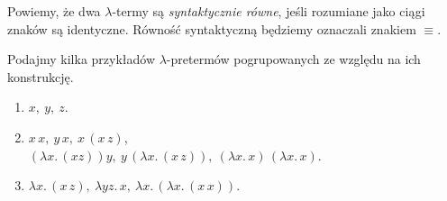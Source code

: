 Powiemy, że dwa \(\lambda\)-termy są \emph{syntaktycznie równe}, jeśli rozumiane jako ciągi znaków są identyczne. Równość syntaktyczną będziemy oznaczali znakiem \(\equiv\).

\begin{przyklad}
  Podajmy kilka przykładów \(\lambda\)-pretermów pogrupowanych ze względu na ich konstrukcję.
  \begin{enumerate}[label={(P\arabic*):}, ref={(P\arabic*)}]
    \setlength\itemsep{0em}
    \item \(x,\ y,\ z\).
    \item \(x\,x,\ y\,x,\ x\,(x\,z)\),\\
          \((\lambda x .\, (x z)) y,\
             y\, (\lambda x .\, (x\, z)),\ (\lambda x .\, x)\,(\lambda x .\, x)\).
    \item \( \lambda x .\, (x \, z),\
             \lambda y z .\, x,\
             \lambda x .\, (\lambda x .\, (x\, x))\).
  \end{enumerate}
\end{przyklad}




